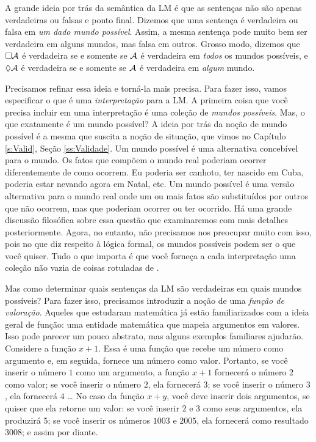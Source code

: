 A grande ideia por trás da semântica da LM é que as sentenças não são apenas verdadeiras ou falsas e ponto final.  Dizemos que uma  sentença é verdadeira ou falsa em \emph{um dado mundo possível}. Assim,  a mesma sentença pode muito bem ser verdadeira em alguns mundos,  mas falsa em outros. Grosso modo, dizemos que $\Box \mathcal{A}$ é verdadeira   se e somente se $\mathcal{A}$ é verdadeira em \emph{todos} os mundos possíveis, e $\Diamond\mathcal{A}$ é verdadeira se e somente se  $\mathcal{A}$ é verdadeira em \emph{algum} mundo.

Precisamos refinar essa ideia e torná-la mais precisa. Para fazer isso,  vamos especificar o que é uma  \emph{interpretação} para a LM. A primeira coisa que você precisa incluir em uma interpretação é uma coleção de \emph{mundos possíveis}. 
Mas, o que exatamente é um mundo possível? A ideia por trás da noção de mundo possível é a mesma que suscita a noção de situação, que vimos no Capítulo \ref{s:Valid}, Seção \ref{ss:Validade}. Um mundo possível é uma alternativa concebível para o mundo. Os fatos que compõem o mundo real poderiam ocorrer diferentemente de como ocorrem. Eu poderia ser canhoto, ter nascido em Cuba, poderia estar nevando agora em Natal, etc. Um mundo possível é uma versão alternativa para o mundo real onde um ou mais fatos são substituídos por outros que não ocorrem, mas que poderiam ocorrer ou ter ocorrido. 
Há uma grande discussão filosófica sobre  essa questão que examinaremos com mais detalhes posteriormente. Agora, no entanto,  não precisamos nos preocupar muito com isso, pois no que diz respeito à lógica formal, os mundos possíveis podem ser o que você quiser. Tudo o que importa é que você forneça a cada interpretação uma coleção não vazia de coisas rotuladas  de  .


Mas como determinar quais sentenças da LM são verdadeiras em quais mundos possíveis? Para fazer isso, precisamos introduzir a noção de uma \emph{função de valoração}. Aqueles que estudaram matemática já estão familiarizados com a ideia geral de função: uma entidade matemática que mapeia argumentos em valores. Isso pode parecer um pouco abstrato, mas alguns exemplos familiares ajudarão. Considere a função $x + 1$. Essa é uma função que recebe um número como argumento e, em seguida, fornece um número como valor. Portanto, se você inserir o número $1$ como um argumento, a função $x + 1$ fornecerá o número $2$ como valor; se você inserir o número  $2$, ela fornecerá $3$; se você inserir o número  $3$, ela fornecerá $4$ \dots{}  No caso da função $x + y$, você deve inserir dois argumentos, se quiser que ela retorne um valor: se você inserir $2$ e $3$ como seus argumentos, ela produzirá $5$; se você inserir os números  $1003$ e $2005$, ela fornecerá como resultado $3008$; e assim por diante.


